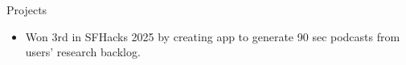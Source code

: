 \documentclass{resume} %
\begin{document}
\begin{workSection}{Projects}

	\customItem[
	title=\href{https://github.com/chesterCaii/back-logz/}{Backlogz }, %
	technologies= | React Native{,} Expo-Router{,} TypeScript
	]
	\begin{itemize}
		\vspace{-0.5em}
		\itemsep -6pt {}
		\item Won 3rd in SFHacks 2025 by creating app to generate 90 sec podcasts from users' research backlog.
	\end{itemize}
	
	
	

\end{workSection}
\end{document}
